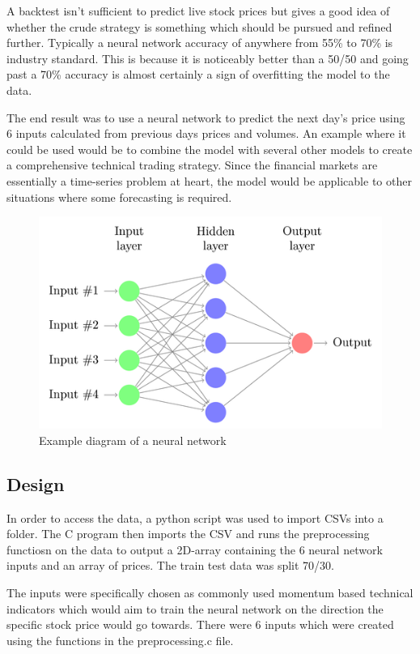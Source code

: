 \documentclass[11pt]{article}
\begin{document}
A backtest isn't sufficient to predict live stock prices but gives a good idea of whether the crude strategy is something which should be pursued and refined further. Typically a neural network accuracy of anywhere from 55\% to 70\% is industry standard. This is because it is noticeably better than a 50/50 and going past a 70\% accuracy is almost certainly a sign of overfitting the model to the data. 

The end result was to use a neural network to predict the next day's price using 6 inputs calculated from previous days prices and volumes. An example where it could be used would be to combine the model with several other models to create a comprehensive technical trading strategy. Since the financial markets are essentially a time-series problem at heart, the model would be applicable to other situations where some forecasting is required. 

\begin{figure}[h]
\includegraphics[scale=0.8]{neural-network}
\caption{Example diagram of a neural network}
\end{figure}

\subsection{Design}
In order to access the data, a python script was used to import CSVs into a folder. The C program then imports the CSV and runs the preprocessing functiosn on the data to output a 2D-array containing the 6 neural network inputs and an array of prices. The train test data was split 70/30.

The inputs were specifically chosen as commonly used momentum based technical indicators which would aim to train the neural network on the direction the specific stock price would go towards. There were 6 inputs which were created using the functions in the preprocessing.c file. 
\end{document}
